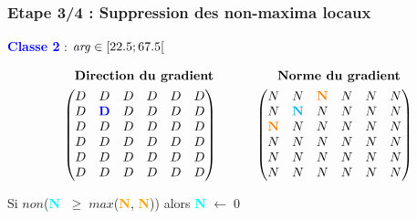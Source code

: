 \documentclass{beamer}
\begin{document}
\begin{frame}
\frametitle{Etape 3/4 : Suppression des non-maxima locaux}

\begin{center}
\textcolor{blue}{\textbf{Classe 2}} : $ \text{\emph{arg}} \in [22.5; 67.5[ $
\end{center}

\begin{align*}
& \quad \textbf{Direction du gradient} \qquad \qquad \quad \textbf{Norme du gradient} \\
& \begin{pmatrix}
D & D & D & D & D & D \\
D & \textcolor{blue}{\textbf{D}} & D & D & D & D \\
D & D & D & D & D & D \\
D & D & D & D & D & D \\
D & D & D & D & D & D \\
D & D & D & D & D & D \\
\end{pmatrix}
\qquad \quad
\begin{pmatrix}
N & N & \textcolor{orange}{\textbf{N}} & N & N & N \\
N & \textcolor{cyan}{\textbf{N}} & N & N & N & N \\
\textcolor{orange}{\textbf{N}} & N & N & N & N & N \\
N & N & N & N & N & N \\
N & N & N & N & N & N \\
N & N & N & N & N & N \\
\end{pmatrix}
\end{align*}

\begin{center}
Si $ non $(\textbf{\textcolor{cyan}{N}} $ \; \geq \; max $(\textbf{\textcolor{orange}{N}}, \textbf{\textcolor{orange}{N}})) alors \textbf{\textcolor{cyan}{N}} $ \leftarrow \; 0 $
\end{center}
\end{frame}
\end{document}
